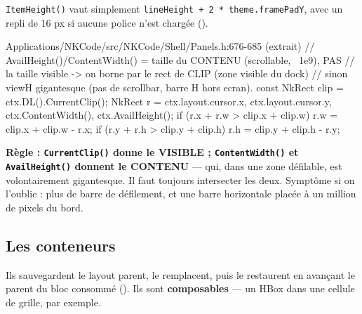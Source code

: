 \texttt{ItemHeight()} vaut simplement \texttt{lineHeight + 2 * theme.framePadY},
avec un repli de 16 px si aucune police n'est chargée
().

\begin{nkpiege}
\begin{nkcode}{Applications/NKCode/src/NKCode/Shell/Panels.h:676-685 (extrait)}
// AvailHeight()/ContentWidth() = taille du CONTENU (scrollable, ~1e9), PAS
// la taille visible -> on borne par le rect de CLIP (zone visible du dock)
// sinon viewH gigantesque (pas de scrollbar, barre H hors ecran).
const NkRect clip = ctx.DL().CurrentClip();
NkRect r = {ctx.layout.cursor.x, ctx.layout.cursor.y, ctx.ContentWidth(), ctx.AvailHeight()};
if (r.x + r.w > clip.x + clip.w) r.w = clip.x + clip.w - r.x;
if (r.y + r.h > clip.y + clip.h) r.h = clip.y + clip.h - r.y;
\end{nkcode}

\textbf{Règle : \texttt{CurrentClip()} donne le VISIBLE ;
\texttt{ContentWidth()} et \texttt{AvailHeight()} donnent le CONTENU} — qui,
dans une zone défilable, est volontairement gigantesque. Il faut toujours
intersecter les deux. Symptôme si on l'oublie : plus de barre de défilement, et
une barre horizontale placée à un million de pixels du bord.
\end{nkpiege}

\subsection{Les conteneurs}

Ils sauvegardent le layout parent, le remplacent, puis le restaurent en avançant
le parent du bloc consommé (). Ils sont
\textbf{composables} — un HBox dans une cellule de grille, par exemple.

